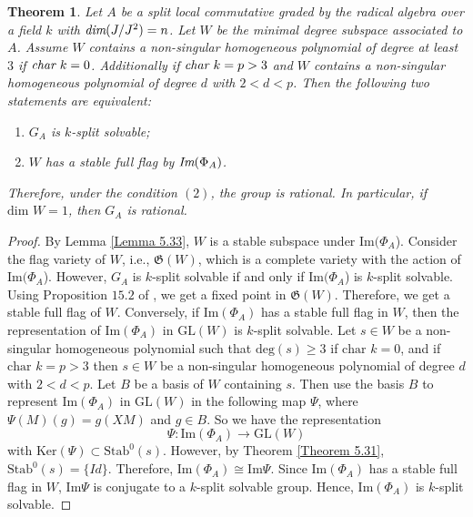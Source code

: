 \documentclass[12pt]{amsart}
\newtheorem{theorem}{Theorem}[section]
\theoremstyle{definition}
\numberwithin{equation}{section}
\begin{document}
\begin{theorem}\label{Theorem 5.35}
Let $A$ be a split local commutative graded by the radical algebra over a field $k$ with $\emph{dim}(J/J^2)=n$. Let $W$ be the minimal degree subspace associated to $A$. Assume $W$ contains a non-singular homogeneous polynomial of degree at least $3$ if $\emph{char }k=0$. Additionally if $\emph{char }k=p>3$ and $W$ contains a non-singular homogeneous polynomial of degree $d$ with $2<d<p$. Then the following two statements are equivalent: 
\begin{enumerate}
\item $G_A$ is $k$-split solvable; 
\vskip2mm
\item $W$ has a stable full flag by $\emph{\text{Im}}(\Phi_A)$.
\end{enumerate}
Therefore, under the condition $(2)$, the group is rational. In particular, if $\text{dim }W=1$, then $G_A$ is rational.
\end{theorem}
\vskip1mm
\begin{proof}
By Lemma \ref{Lemma 5.33}, $W$ is a stable subspace under $\text{Im}(\Phi_A$). Consider the flag variety of $W$, i.e., $\mathfrak{G}(W)$, which is a complete variety with the action of $\text{Im}(\Phi_A$). However, $G_A$ is $k$-split solvable if and only if $\text{Im}(\Phi_A$) is $k$-split solvable. Using Proposition $15.2$ of \cite{Borel}, we get a fixed point in $\mathfrak{G}(W)$. Therefore, we get a stable full flag of $W$. Conversely, if $\text{Im}(\Phi_A)$ has a stable full flag in $W$, then the representation of $\text{Im}(\Phi_A)$ in $\text{GL}(W)$ is $k$-split solvable. Let $s\in W$ be a non-singular homogeneous polynomial such that $\text{deg}(s)\geq 3$ if $\text{char }k=0$, and if $\text{char }k=p>3$ then $s\in W$ be a non-singular homogeneous polynomial of degree $d$ with $2<d<p$. Let $B$ be a basis of $W$ containing $s$. Then use the basis $B$ to represent $\text{Im}(\Phi_A)$ in $\text{GL}(W)$ in the following map $\Psi$, where $\Psi(M)(g)=g(XM)$ and $g\in B$. So we have the representation \[\Psi:\text{Im}(\Phi_A)\rightarrow \text{GL}(W)\] with $\text{Ker}(\Psi)\subset \text{Stab}^{0}(s)$. However, by Theorem \ref{Theorem 5.31}, $\text{Stab}^{0}(s)=\{Id\}$. Therefore, $\text{Im}(\Phi_A)\cong \text{Im}\Psi.$ Since $\text{Im}(\Phi_A)$ has a stable full flag in $W$, $\text{Im}\Psi$ is conjugate to a $k$-split solvable group. Hence, $\text{Im}(\Phi_A)$ is $k$-split solvable.
\end{proof}
\end{document}
